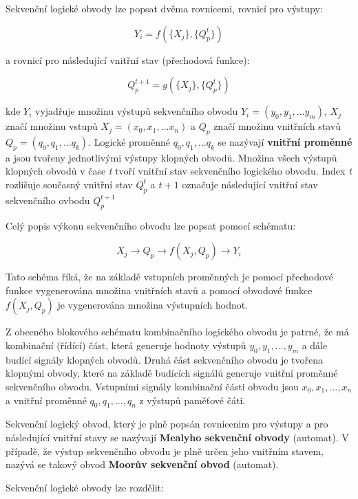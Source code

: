 \vskip 4mm
\centerline{}
\vskip 4mm

Sekvenční logické obvody lze popsat dvěma rovnicemi, rovnicí pro výstupy:

$$ Y_i = f(\{X_j\}, \{Q_p^t\}) $$ 

a rovnicí pro následující vnitřní stav (přechodová funkce):

$$Q_p^{t+1} = g(\{X_j\},\{Q_p^t\})$$

kde $Y_i$ vyjadřuje množinu výstupů sekvenčního obvodu $Y_i = (y_0, y_1, ... y_m)$, $X_j$ značí množinu vstupů $X_j = (x_0, x_1, ... x_n)$ a $Q_p$ značí množinu vnitřních stavů $Q_p = (q_0, q_1, ... q_k)$. Logické proměnné $q_0, q_1, ... q_k$ se nazývají {\bf vnitřní proměnné} a jsou tvořeny jednotlivými výstupy klopných obvodů. Množina všech výstupů klopných obvodů v čase {\it t} tvoří vnitřní stav sekvenčního logického obvodu. Index {\it t} rozlišuje současný vnitřní stav $Q_p^t$ a $t+1$ označuje následující vnitřní stav sekvenčního ovbodu $Q_p^{t+1}$

Celý popis výkonu sekvenčního obvodu lze popsat pomocí schématu:

$$ X_j \rightarrow Q_p \rightarrow f(X_j, Q_p) \rightarrow Y_i $$

Tato schéma říká, že na základě vstupních proměnných je pomocí přechodové funkce vygenerována množina vnitřních stavů a pomocí obvodové funkce $f(X_j, Q_p)$ je vygenerována množina výstupních hodnot.

\vskip 4mm
\centerline{}
\vskip 4mm

Z obecného blokového schématu kombinačního logického obvodu je patrné, že má kombinační (řídící) část, která generuje hodnoty výstupů $y_0, y_1, ..., y_m$ a dále budící signály klopných obvodů. Druhá část sekvenčního obvodu je tvořena klopnými obvody, které na základě budících signálů generuje vnitřní proměnné sekvenčního obvodu. Vstupními signály kombinační části obvodu jsou $x_0, x_1, ..., x_n$ a vnitřní proměnné $q_0, q_1, ..., q_n$ z výstupů paměťové čáti.


Sekvenční logický obvod, který je plně popsán rovnicenim pro výstupy a pro následující vnitřní stavy se nazývají {\bf Mealyho sekvenční obvody} (automat). V případě, že výstup sekvenčního obvodu je plně určen jeho vnitřním stavem, nazývá se takový obvod  {\bf Moorův sekvenční obvod} (automat).


Sekvenční logické obvody lze rozdělit:

